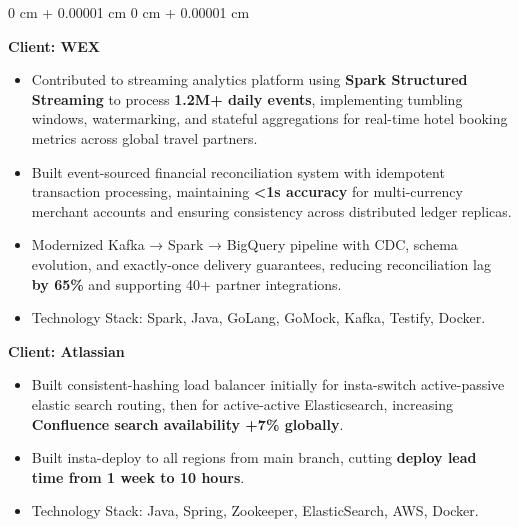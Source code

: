 \documentclass[10pt, letterpaper]{article}
\newenvironment{onecolentry}{
    \begin{adjustwidth}{
        0 cm + 0.00001 cm
    }{
        0 cm + 0.00001 cm
    }
}{
    \end{adjustwidth}
} %
\begin{document}
\begin{onecolentry}
            \vspace{0.10 cm}
            \hspace{0.5cm}\textbf{Client: WEX}
            \begin{itemize}[
                topsep=0.10 cm,
                parsep=0.10 cm,
                partopsep=0pt,
                itemsep=0pt,
                leftmargin=0 cm + 10pt + 0.5cm
            ]
            \item Contributed to streaming analytics platform using \textbf{Spark Structured Streaming} to process \textbf{1.2M+ daily events}, implementing tumbling windows, watermarking, and stateful aggregations for real-time hotel booking metrics across global travel partners.
            \item Built event-sourced financial reconciliation system with idempotent transaction processing, maintaining \textbf{<1s accuracy} for multi-currency merchant accounts and ensuring consistency across distributed ledger replicas.
            \item Modernized Kafka → Spark → BigQuery pipeline with CDC, schema evolution, and exactly-once delivery guarantees, reducing reconciliation lag \textbf{by 65\%} and supporting 40+ partner integrations.
            \item Technology Stack: Spark, Java, GoLang, GoMock, Kafka, Testify, Docker.
            \end{itemize}
            
            \vspace{0.10 cm}
            \hspace{0.5cm}\textbf{Client: Atlassian}
            \begin{itemize}[
                topsep=0.10 cm,
                parsep=0.10 cm,
                partopsep=0pt,
                itemsep=0pt,
                leftmargin=0 cm + 10pt + 0.5cm
            ]
                \item Built consistent-hashing load balancer initially for insta-switch active-passive elastic search routing, then for active-active Elasticsearch, increasing \textbf{Confluence search availability +7\% globally}.
                \item Built insta-deploy to all regions from main branch, cutting \textbf{deploy lead time from 1 week to 10 hours}.
                \item Technology Stack: Java, Spring, Zookeeper, ElasticSearch, AWS, Docker.
            \end{itemize}
            

\end{onecolentry}
\end{document}

